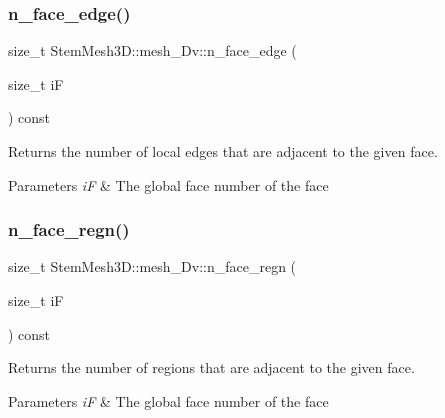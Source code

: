 \subsubsection{\texorpdfstring{n\+\_\+face\+\_\+edge()}{n\_face\_edge()}}
{\footnotesize\ttfamily size\+\_\+t Stem\+Mesh3\+D\+::mesh\+\_\+Dv\+::n\+\_\+face\+\_\+edge (\begin{DoxyParamCaption}\item[{size\+\_\+t}]{iF }\end{DoxyParamCaption}) const}



Returns the number of local edges that are adjacent to the given face. 


\begin{DoxyParams}{Parameters}
{\em iF} & The global face number of the face \\
\hline
\end{DoxyParams}
\mbox{\label{classStemMesh3D_1_1mesh__3Dv_a121da582c92b922a0d6ca76a0f1330ee}} 
\subsubsection{\texorpdfstring{n\+\_\+face\+\_\+regn()}{n\_face\_regn()}}
{\footnotesize\ttfamily size\+\_\+t Stem\+Mesh3\+D\+::mesh\+\_\+Dv\+::n\+\_\+face\+\_\+regn (\begin{DoxyParamCaption}\item[{size\+\_\+t}]{iF }\end{DoxyParamCaption}) const}



Returns the number of regions that are adjacent to the given face. 


\begin{DoxyParams}{Parameters}
{\em iF} & The global face number of the face \\
\hline
\end{DoxyParams}
\mbox{\label{classStemMesh3D_1_1mesh__3Dv_a02974473e896bc49a5a19cd92b521061}} 
